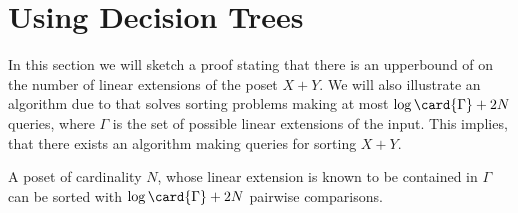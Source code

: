 \section{Using Decision Trees}
\label{tree:xy:dt}

In this section we will sketch a proof stating that there is an upperbound of 
on the number of linear extensions of the poset $X + Y$. We will also
illustrate an algorithm due to \citet*{fredman:1976} that solves sorting problems
making at most $\log\card{\Gamma} + 2N$ queries, where $\Gamma$ is the set of
possible linear extensions of the input. This implies, that there exists an
algorithm making  queries for sorting $X + Y$.

\begin{theorem}\label{theorem:fredman:1976}
A poset of cardinality $N$, whose linear extension is known to be contained in
$\Gamma$ can be sorted with $\log \card{\Gamma} + 2N$ pairwise comparisons.
\end{theorem}
